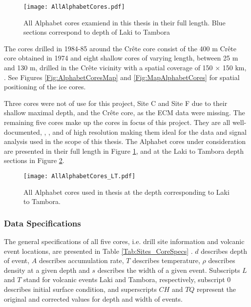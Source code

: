 \documentclass[../../CompleteThesis2/Complete_2ndDraft]{subfiles}
\begin{document}
\begin{figure}[!htb]
	\centering
	\texttt{[image: AllAlphabetCores.pdf]}
	\caption[All Alphabet core $\delta^{18}$O profiles in full]{\small All Alphabet cores examiend in this thesis in their full length. Blue sections correspond to depth of Laki to Tambora}
	\label{fig:AllAlphabetCores}
\end{figure}

The cores drilled in 1984-85 around the Crête core consist of the 400 m Crête core obtained in 1974 \cite[H. Clausen et al., 1988]{Clausen1988a} and eight shallow cores of varying length, between 25 m and 130 m, drilled in the Crête vicinity with a spatial coverage of 150 $\times$ 150 km, \cite[Clausen, Gundestrup, Johnsen 1988]{Clausen1988a}. See Figures \ref{Fig:AlphabetCoresMap} and \ref{Fig:MapAlphabetCores} for spatial positioning of the ice cores.

Three cores were not of use for this project, Site C and Site F due to their shallow maximal depth, and the Crête core, as the ECM data were missing.
The remaining five cores make up the cores in focus of this project. They are all well-documented, \cite[Clausen \& Hammer, 1988]{ClausenHammer1988}, \cite[Clausen, Gundestrup, Johnsen 1988]{Clausen1988a}, and of high resolution making them ideal for the data and signal analysis used in the scope of this thesis. The Alphabet cores under consideration are presented in their full length in Figure \ref{fig:AllAlphabetCores}, and at the Laki to Tambora depth sections in Figure \ref{fig:AllAlphabetCores_LT}.


\begin{figure}[h]
	\centering
	\texttt{[image: AllAlphabetCores\_LT.pdf]}
	\caption[All Alphabet core $\delta^{18}$O profiles, depths from Laki to Tambora]{\small All Alphabet cores used in thesis at the depth corresponding to Laki to Tambora.}
	\label{fig:AllAlphabetCores_LT}
\end{figure}



\subsubsection[Data Specifications][Data Specifications]{Data Specifications}
\label{Subsubsec:Data_Selection_Alhabet_Specifications}

The general specifications of all five cores, i.e. drill site information and volcanic event locations, are presented in Table \ref{Tab:Sites_CoreSpecs} \cite{ClausenHammer1988}.
$d$ describes depth of event, $A$ describes accumulation rate, $T$ describes temperature, $\rho$ describes density at a given depth and $s$ describes the width of a given event. Subscripts $L$ and $T$ stand for volcanic events Laki and Tambora, respectively, subscript $0$ describes initial surface condition, and superscripts $CH$ and $TQ$ represent the original and corrected values for depth and width of events.
\end{document}
